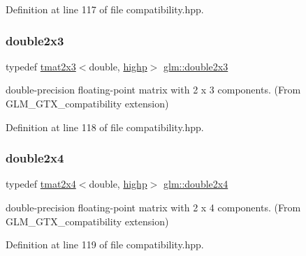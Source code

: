 Definition at line 117 of file compatibility.\+hpp.

\mbox{\label{group__gtx__compatibility_ga60ae0f5858d498b2e5b9bb8d23019db0}} 
\subsubsection{\texorpdfstring{double2x3}{double2x3}}
{\footnotesize\ttfamily typedef \mbox{\hyperlink{structglm_1_1tmat2x3}{tmat2x3}}$<$double, \mbox{\hyperlink{namespaceglm_a0f04f086094c747d227af4425893f545ac6f7eab42eacbb10d59a58e95e362074}{highp}}$>$ \mbox{\hyperlink{group__gtx__compatibility_ga60ae0f5858d498b2e5b9bb8d23019db0}{glm\+::double2x3}}}



double-\/precision floating-\/point matrix with 2 x 3 components. (From G\+L\+M\+\_\+\+G\+T\+X\+\_\+compatibility extension) 



Definition at line 118 of file compatibility.\+hpp.

\mbox{\label{group__gtx__compatibility_gadb90656f5faac0e800718a0a19bf0e03}} 
\subsubsection{\texorpdfstring{double2x4}{double2x4}}
{\footnotesize\ttfamily typedef \mbox{\hyperlink{structglm_1_1tmat2x4}{tmat2x4}}$<$double, \mbox{\hyperlink{namespaceglm_a0f04f086094c747d227af4425893f545ac6f7eab42eacbb10d59a58e95e362074}{highp}}$>$ \mbox{\hyperlink{group__gtx__compatibility_gadb90656f5faac0e800718a0a19bf0e03}{glm\+::double2x4}}}



double-\/precision floating-\/point matrix with 2 x 4 components. (From G\+L\+M\+\_\+\+G\+T\+X\+\_\+compatibility extension) 



Definition at line 119 of file compatibility.\+hpp.

\mbox{\label{group__gtx__compatibility_ga80c4961ce61e918f21c1546d43aea2f0}} 
